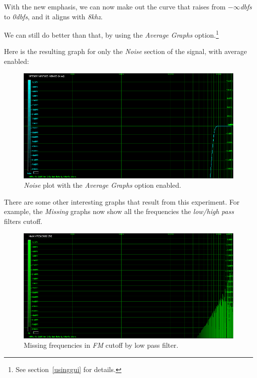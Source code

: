 \documentclass[10pt,a4paper]{report}
\newcommand{\khz}[1]{\textit{\mbox{#1\acrshort{khz}}}}
\newcommand{\db}[1]{\textit{\mbox{#1\acrshort{dbfs}}}}
\begin{document}
With the new emphasis, we can now make out the curve that raises from \db{$-\infty$} to \db{0}, and it aligns with \khz{8}.

We can still do better than that, by using the \textit{Average Graphs} option.\footnote{See section~\ref{usinggui} for details.}

Here is the resulting graph for only the \textit{Noise} section of the signal, with average enabled:

\begin{figure}[H]
	\centering
	\includegraphics[width=1.0\linewidth]{images/interpretation/Plot4-3-AVG-Noise.png}
	\caption[Noise Average]{\textit{Noise} plot with the \textit{Average Graphs} option enabled.}
	\label{fig:plot4-3-avg-noise}
\end{figure}

There are some other interesting graphs that result from this experiment. For example, the \textit{Missing} graphs now show all the frequencies the \textit{low/high pass} filters cutoff.

\begin{figure}[H]
	\centering
	\includegraphics[width=1.0\linewidth]{images/interpretation/Plot4-4-Missing-FM.png}
	\caption[Missing FM]{Missing frequencies in \textit{FM} cutoff by low pass filter.}
	\label{fig:plot4-4-missing-fm}
\end{figure}
\end{document}

